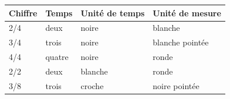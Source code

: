 \begin{tabular}{@{}l l l l@{}}
\toprule
\textbf{Chiffre} & \textbf{Temps} & \textbf{Unité de temps} & \textbf{Unité de mesure} \\
\midrule
2/4 & deux & noire & blanche \\
3/4 & trois & noire & blanche pointée \\
4/4 & quatre & noire & ronde \\
2/2 & deux & blanche & ronde \\
3/8 & trois & croche & noire pointée \\
\bottomrule
\end{tabular}
